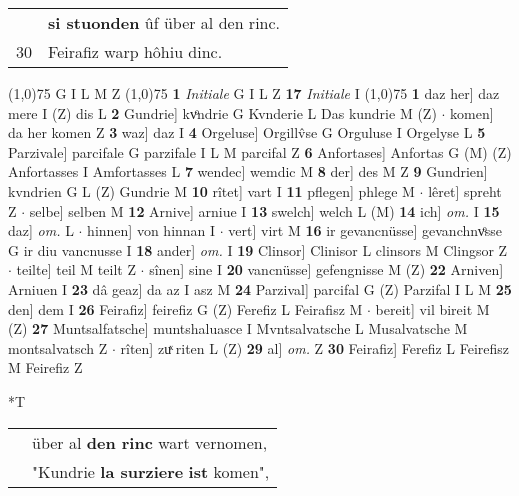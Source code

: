 \documentclass[8pt,a4paper,notitlepage]{article}
\begin{document}
\begin{table}[ht]
\begin{minipage}[t]{0.5\linewidth}
\begin{tabular}{rl}
 & \textbf{si stuonden} ûf über al den rinc.\\ 
30 & Feirafiz warp hôhiu dinc.\\ 
\end{tabular}
\scriptsize
\line(1,0){75} \newline
G I L M Z \newline
\line(1,0){75} \newline
\textbf{1} \textit{Initiale} G I L Z  \textbf{17} \textit{Initiale} I  \newline
\line(1,0){75} \newline
\textbf{1} daz her] daz mere I (Z) dis L \textbf{2} Gundrie] kvͦndrie G Kvnderie L Das kundrie M (Z)  $\cdot$ komen] da her komen Z \textbf{3} waz] daz I \textbf{4} Orgeluse] Orgillv̂se G Orguluse I Orgelyse L \textbf{5} Parzivale] parcifale G parzifale I L M parcifal Z \textbf{6} Anfortases] Anfortas G (M) (Z) Anfortasses I Amfortasses L \textbf{7} wendec] wemdic M \textbf{8} der] des M Z \textbf{9} Gundrien] kvndrien G L (Z) Gundrie M \textbf{10} rîtet] vart I \textbf{11} pflegen] phlege M  $\cdot$ lêret] spreht Z  $\cdot$ selbe] selben M \textbf{12} Arnive] arniue I \textbf{13} swelch] welch L (M) \textbf{14} ich] \textit{om.} I \textbf{15} daz] \textit{om.} L  $\cdot$ hinnen] von hinnan I  $\cdot$ vert] virt M \textbf{16} ir gevancnüsse] gevanchnvͦsse G ir diu vancnusse I \textbf{18} ander] \textit{om.} I \textbf{19} Clinsor] Clinisor L clinsors M Clingsor Z  $\cdot$ teilte] teil M teilt Z  $\cdot$ sînen] sine I \textbf{20} vancnüsse] gefengnisse M (Z) \textbf{22} Arniven] Arniuen I \textbf{23} dâ geaz] da az I asz M \textbf{24} Parzival] parcifal G (Z) Parzifal I L M \textbf{25} den] dem I \textbf{26} Feirafiz] feirefiz G (Z) Ferefiz L Feirafisz M  $\cdot$ bereit] vil bireit M (Z) \textbf{27} Muntsalfatsche] muntshaluasce I Mvntsalvatsche L Musalvatsche M montsalvatsch Z  $\cdot$ rîten] zuͯ riten L (Z) \textbf{29} al] \textit{om.} Z \textbf{30} Feirafiz] Ferefiz L Feirefisz M Feirefiz Z \newline
\end{minipage}
\hspace{0.5cm}
\begin{minipage}[t]{0.5\linewidth}
\small
\begin{center}*T
\end{center}
\begin{tabular}{rl}
 & über al \textbf{den rinc} wart vernomen,\\ 
 & "Kundrie \textbf{la surziere} \textbf{ist} komen",\\ 

\end{tabular}
\end{minipage}
\end{table}
\end{document}
